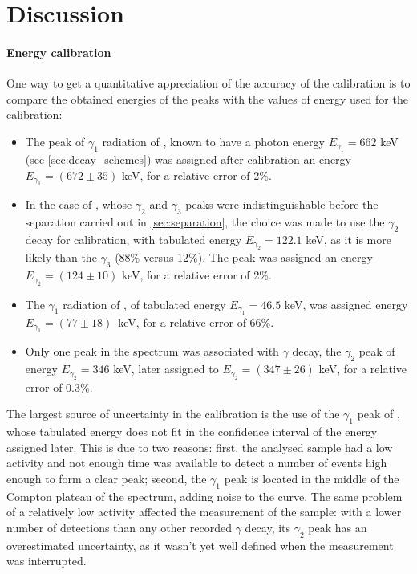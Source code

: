 \section{Discussion}
\paragraph{Energy calibration}

One way to get a quantitative appreciation of the accuracy of the calibration is to compare the obtained energies of the peaks with the values of energy used for the calibration:
\begin{itemize}
    \item The peak of $\gamma_1$ radiation of \cesium, known to have a photon energy $E_{\gamma_1} = 662$ keV (see \autoref{sec:decay_schemes}) was assigned after calibration an energy $E_{\gamma_1} = (672 \pm 35)$ keV, for a relative error of 2\%.
    \item In the case of \cobalt, whose $\gamma_2$ and $\gamma_3$ peaks were indistinguishable before the separation carried out in \autoref{sec:separation},
    the choice was made to use the $\gamma_2$ decay for calibration, with tabulated energy $E_{\gamma_2} = 122.1$ keV, as it is more likely than the $\gamma_3$ (88\% versus 12\%).
    The peak was assigned an energy $E_{\gamma_2} = (124 \pm 10)$ keV, for a relative error of 2\%.
    \item The $\gamma_1$ radiation of \lead, of tabulated energy $E_{\gamma_1} = 46.5$ keV, was assigned energy \mbox{$E_{\gamma_1} = (77 \pm 18)$ keV}, for a relative error of 66\%.
    \item Only one peak in the \hafnium spectrum was associated with $\gamma$ decay, the $\gamma_2$ peak of energy $E_{\gamma_2} = 346$ keV, later assigned to $E_{\gamma_2} = (347 \pm 26)$ keV, for a relative error of 0.3\%.
\end{itemize}
The largest source of uncertainty in the calibration is the use of the $\gamma_1$ peak of \lead, whose tabulated energy does not fit in the confidence interval of the energy assigned later.
This is due to two reasons: first, the analysed sample had a low activity and not enough time was available to detect a number of events high enough to form a clear peak;
second, the $\gamma_1$ peak is located in the middle of the Compton plateau of the spectrum, adding noise to the curve.
The same problem of a relatively low activity affected the measurement of the \hafnium sample:
with a lower number of detections than any other recorded $\gamma$ decay, its $\gamma_2$ peak has an overestimated uncertainty, as it wasn't yet well defined when the measurement was interrupted.

